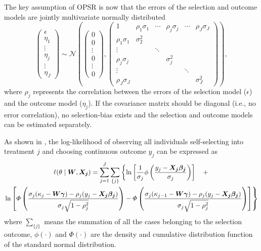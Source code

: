 \documentclass[%
    twoside, openright, titlepage, numbers=noenddot,%
    cleardoublepage=empty,%
    abstract=false,%
    BCOR=5.5mm, paper=a5, fontsize=10pt,%
]{scrreprt}
\begin{document}
The key assumption of OPSR is now that the errors of the selection and outcome models are jointly multivariate normally distributed
%
\begin{equation} \label{eq:multi-norm}
\begin{pmatrix}
\epsilon \\
\eta_1 \\
\vdots \\
\eta_j \\
\vdots \\
\eta_J
\end{pmatrix}
\sim \mathcal{N}\left(
\begin{pmatrix}
0 \\
0 \\
\vdots \\
0 \\
\vdots \\
0
\end{pmatrix},
\begin{pmatrix}
1 & \rho_1 \sigma_1 & \cdots & \rho_j \sigma_j & \cdots & \rho_J \sigma_J \\
\rho_1 \sigma_1 & \sigma_2^2 \\
\vdots &  & \ddots \\
\rho_j \sigma_j & & & \sigma_j^2 \\
\vdots & & & & \ddots \\
\rho_J \sigma_J & & & & & \sigma_J^2
\end{pmatrix}
\right),
\end{equation}
%
where $\rho_j$ represents the correlation between the errors of the selection model ($\epsilon$) and the \jth outcome model ($\eta_j$). If the covariance matrix should be diagonal (i.e., no error correlation), no selection-bias exists and the selection and outcome models can be estimated separately.

As shown in \cite{Wang+Mokhtarian:2024}, the log-likelihood of observing all individuals self-selecting into treatment $j$ and choosing continuous outcome $y_j$ can be expressed as
%
\begin{multline} \label{eq:log-lik}
\ell(\theta \mid \boldsymbol{W}, \boldsymbol{X_j}) = \sum_{j = 1}^{J} \sum_{\{j\}}
\left\{
\ln\left[
\frac{1}{\sigma_j} \phi\left(\frac{y_j - \boldsymbol{X_j}\boldsymbol{\beta_j}}{\sigma_j}\right)
\right] \quad + \right. \\
\left. \ln\left[
\Phi\left(
\frac{\sigma_j (\kappa_j - \boldsymbol{W}\boldsymbol{\gamma}) - \rho_j(y_j - \boldsymbol{X_j}\boldsymbol{\beta_j})}{\sigma_j\sqrt{1 - \rho_j^2}}
\right) -
\Phi\left(
\frac{\sigma_j (\kappa_{j-1} - \boldsymbol{W}\boldsymbol{\gamma}) - \rho_j(y_j - \boldsymbol{X_j}\boldsymbol{\beta_j})}{\sigma_j\sqrt{1 - \rho_j^2}}
\right)
\right]
\right\}
\end{multline}
%
where $\sum_{\{j\}}$ means the summation of all the cases belonging to the \jth selection outcome, $\phi(\cdot)$ and $\Phi(\cdot)$ are the density and cumulative distribution function of the standard normal distribution.
\end{document}
